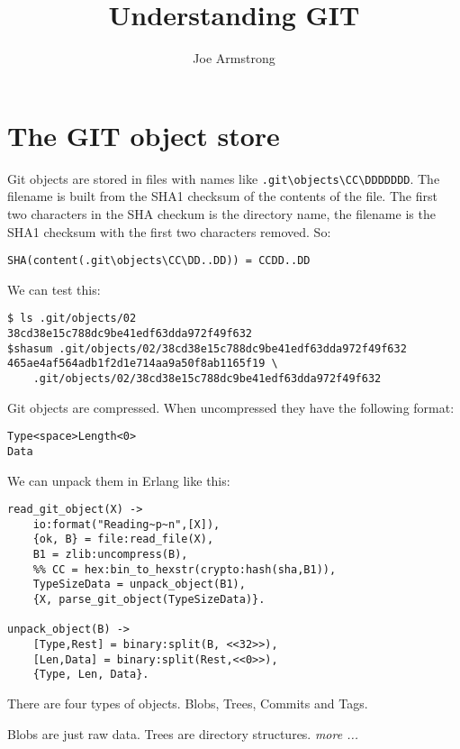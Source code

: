 \documentclass[12pt]{hitec}
\title{Understanding GIT}
\author{Joe Armstrong}
\begin{document}
\maketitle

\tableofcontents

\section{The GIT object store}

Git objects are stored in files with names like
\verb+.git\objects\CC\DDDDDDD+. The filename is built from the SHA1
checksum of the contents of the file.  The first two characters in the
SHA checkum is the directory name, the filename is the SHA1 checksum with
the first two characters removed. So:

\begin{verbatim}
SHA(content(.git\objects\CC\DD..DD)) = CCDD..DD
\end{verbatim}

We can test this:

\begin{Verbatim}[fontsize=\small,frame=single]
$ ls .git/objects/02
38cd38e15c788dc9be41edf63dda972f49f632
$shasum .git/objects/02/38cd38e15c788dc9be41edf63dda972f49f632 
465ae4af564adb1f2d1e714aa9a50f8ab1165f19 \ 
    .git/objects/02/38cd38e15c788dc9be41edf63dda972f49f632
\end{Verbatim}

Git objects are compressed. When uncompressed they have the following format:

\begin{Verbatim}
Type<space>Length<0>
Data
\end{Verbatim}

We can unpack them in Erlang like this:

\begin{Verbatim}
read_git_object(X) ->
    io:format("Reading~p~n",[X]),
    {ok, B} = file:read_file(X),
    B1 = zlib:uncompress(B),
    %% CC = hex:bin_to_hexstr(crypto:hash(sha,B1)),
    TypeSizeData = unpack_object(B1),
    {X, parse_git_object(TypeSizeData)}.

unpack_object(B) ->
    [Type,Rest] = binary:split(B, <<32>>),
    [Len,Data] = binary:split(Rest,<<0>>),
    {Type, Len, Data}.
\end{Verbatim}

There are four types of objects. Blobs, Trees, Commits and Tags.

Blobs are just raw data. Trees are directory structures. {\sl more ...}
\end{document}
